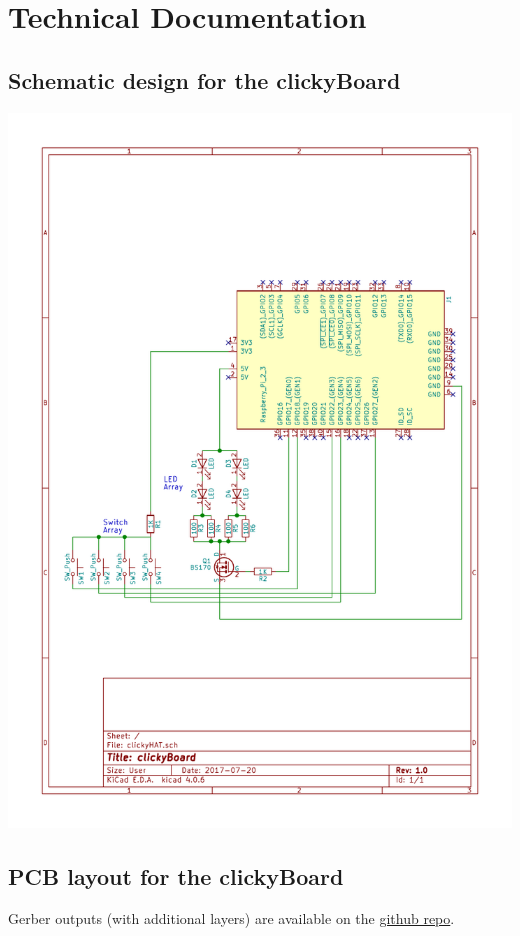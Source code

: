 \documentclass[10pt, a4paper, onesided]{article}
\begin{document}
\newpage
\section{Technical Documentation}
	\subsection{Schematic design for the clickyBoard}
		\begin{center}
			\includegraphics[width=1\linewidth]{img/schematic}
		\end{center}
	
	\newpage
	\subsection{PCB layout for the clickyBoard}
		Gerber outputs (with additional layers) are available on the \href{https://github.com/SecretImbecile/clickyBoard}{github repo}.
\end{document}
